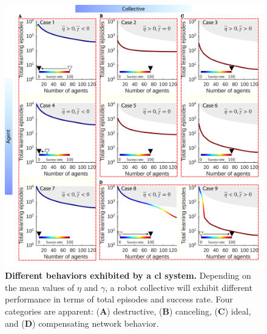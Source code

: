 \documentclass[12pt]{article}
\begin{document}
\begin{figure}[t!]
	\centering
	\includegraphics[width=16cm]{collective_learning_cases.png}
	\caption[] {\label{fig:collective_learning_cases_revised} \textbf{Different behaviors exhibited by a \acl{cl} system.} Depending on the mean values of $ \eta $ and $ \gamma $, a robot collective will exhibit different performance in terms of total episodes and success rate. Four categories are apparent: (\textbf{A}) destructive, (\textbf{B}) canceling, (\textbf{C}) ideal, and (\textbf{D}) compensating network behavior.}
\end{figure}
\end{document}
